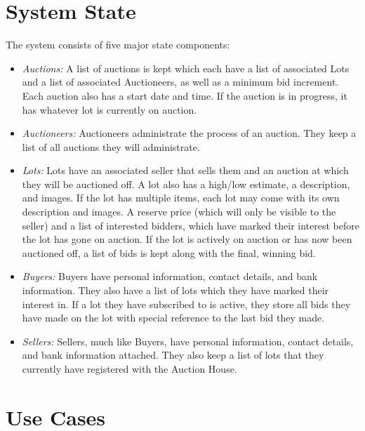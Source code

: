 \documentclass[titlepage, 12pt]{extarticle}
\begin{document}
\section{System State}
The system consists of five major state components:
\begin{itemize}
\item {\it Auctions:} A list of auctions is kept which each have a list of associated Lots and a list of associated Auctioneers, as well as a minimum bid increment. Each auction also has a start date and time. If the auction is in progress, it has whatever lot is currently on auction.
\item {\it Auctioneers:} Auctioneers administrate the process of an auction. They keep a list of all auctions they will administrate.
\item {\it Lots:} Lots have an associated seller that sells them and an auction at which they will be auctioned off. A lot also has a high/low estimate, a description, and images. If the lot has multiple items, each lot may come with its own description and images. A reserve price (which will only be visible to the seller) and a list of interested bidders, which have marked their interest before the lot has gone on auction. If the lot is actively on auction or has now been auctioned off, a list of bids is kept along with the final, winning bid.
\item {\it Buyers:} Buyers have personal information, contact details, and bank information. They also have a list of lots which they have marked their interest in. If a lot they have subscribed to is active, they store all bids they have made on the lot with special reference to the last bid they made.
\item {\it Sellers:} Sellers, much like Buyers, have personal information, contact details, and bank information attached. They also keep a list of lots that they currently have registered with the Auction House.
\end{itemize}

\section{Use Cases}
\end{document}
